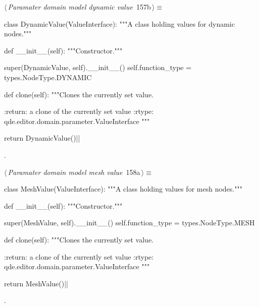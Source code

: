 \documentclass[%
    a4paper,    %
    justified,  %
    nobib,      %
    openany     %
]{tufte-book}
\begin{document}
\begin{flushleft} \small
\begin{minipage}{\linewidth}\label{scrap184}\raggedright\small
{} $\langle\,${\itshape Paramater domain model dynamic value}\nobreak\ {\footnotesize {157b}}$\,\rangle\equiv$
\vspace{-1ex}
\begin{pythoncode}
class DynamicValue(ValueInterface):
    """A class holding values for dynamic nodes."""

    def __init__(self):
        """Constructor."""

        super(DynamicValue, self).__init__()
        self.function_type = types.NodeType.DYNAMIC

    def clone(self):
        """Clones the currently set value.

        :return: a clone of the currently set value
        :rtype:  qde.editor.domain.parameter.ValueInterface
        """

        return DynamicValue()|\NWsep|
\end{pythoncode}
\vspace{1.5ex}
\footnotesize
\begin{list}{}{\setlength{\itemsep}{-\parsep}\setlength{\itemindent}{-\leftmargin}}
\item {\NWtxtMacroNoRef}.

\item{}
\end{list}
\end{minipage}\vspace{4ex}
\end{flushleft}
\begin{flushleft} \small
\begin{minipage}{\linewidth}\label{scrap185}\raggedright\small
{} $\langle\,${\itshape Paramater domain model mesh value}\nobreak\ {\footnotesize {158a}}$\,\rangle\equiv$
\vspace{-1ex}
\begin{pythoncode}
class MeshValue(ValueInterface):
    """A class holding values for mesh nodes."""

    def __init__(self):
        """Constructor."""

        super(MeshValue, self).__init__()
        self.function_type = types.NodeType.MESH

    def clone(self):
        """Clones the currently set value.

        :return: a clone of the currently set value
        :rtype:  qde.editor.domain.parameter.ValueInterface
        """

        return MeshValue()|\NWsep|
\end{pythoncode}
\vspace{1.5ex}
\footnotesize
\begin{list}{}{\setlength{\itemsep}{-\parsep}\setlength{\itemindent}{-\leftmargin}}
\item {\NWtxtMacroNoRef}.

\item{}
\end{list}
\end{minipage}\vspace{4ex}
\end{flushleft}
\end{document}

